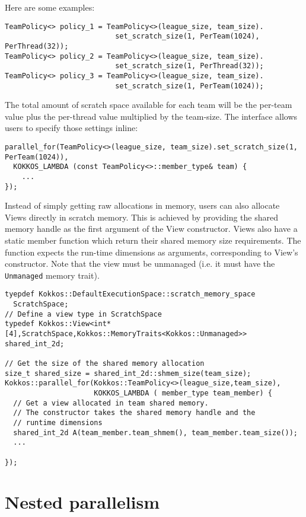 Here are some examples:
\begin{lstlisting}
TeamPolicy<> policy_1 = TeamPolicy<>(league_size, team_size).
                          set_scratch_size(1, PerTeam(1024), PerThread(32));
TeamPolicy<> policy_2 = TeamPolicy<>(league_size, team_size).
                          set_scratch_size(1, PerThread(32));
TeamPolicy<> policy_3 = TeamPolicy<>(league_size, team_size).
                          set_scratch_size(1, PerTeam(1024));
\end{lstlisting} 

The total amount of scratch space available for each team will be the per-team value plus the per-thread value multiplied by the team-size. 
The interface allows users to specify those settings inline:
\begin{lstlisting}
parallel_for(TeamPolicy<>(league_size, team_size).set_scratch_size(1, PerTeam(1024)),
  KOKKOS_LAMBDA (const TeamPolicy<>::member_type& team) {
    ...
});
\end{lstlisting}

Instead of simply getting raw allocations in memory, users can also allocate Views directly in scratch memory. 
This is achieved by providing the shared memory handle as the first argument of the View constructor.
Views also have a static member function which return their shared memory size requirements. 
The function expects the run-time dimensions as arguments, corresponding to View's constructor. 
Note that the view must be unmanaged (i.e. it must have the \lstinline|Unmanaged| memory trait).

\begin{lstlisting}
tyepdef Kokkos::DefaultExecutionSpace::scratch_memory_space
  ScratchSpace;
// Define a view type in ScratchSpace
typedef Kokkos::View<int*[4],ScratchSpace,Kokkos::MemoryTraits<Kokkos::Unmanaged>> shared_int_2d;

// Get the size of the shared memory allocation
size_t shared_size = shared_int_2d::shmem_size(team_size);
Kokkos::parallel_for(Kokkos::TeamPolicy<>(league_size,team_size),
                     KOKKOS_LAMBDA ( member_type team_member) {
  // Get a view allocated in team shared memory.
  // The constructor takes the shared memory handle and the 
  // runtime dimensions
  shared_int_2d A(team_member.team_shmem(), team_member.team_size());
  ...
      
});
\end{lstlisting}

\section{Nested parallelism}\label{S:Hierarchical:Nested}


